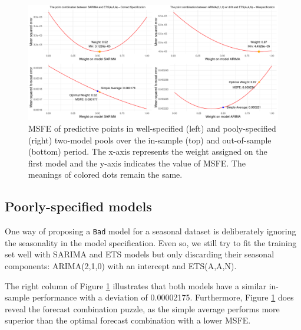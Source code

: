 \documentclass{monashthesis}
\begin{document}
\begin{figure}[ht]
\centering
\includegraphics[scale=0.5]{figures/EMPL.pdf}
\caption{MSFE of predictive points in well-specified (left) and pooly-specified (right) two-model pools over the in-sample (top) and out-of-sample (bottom) period. The x-axis represents the weight assigned on the first model and the y-axis indicates the value of MSFE. The meanings of colored dots remain the same.}
\label{fig:sd}
\end{figure}

\hypertarget{poorly-specified-models}{%
\subsection{Poorly-specified models}\label{poorly-specified-models}}

One way of proposing a \texttt{Bad} model for a seasonal dataset is deliberately ignoring the seasonality in the model specification. Even so, we still try to fit the training set well with SARIMA and ETS models but only discarding their seasonal components: ARIMA(2,1,0) with an intercept and ETS(A,A,N).

The right column of Figure \ref{fig:sd} illustrates that both models have a similar in-sample performance with a deviation of 0.00002175. Furthermore, Figure \ref{fig:sd} does reveal the forecast combination puzzle, as the simple average performs more superior than the optimal forecast combination with a lower MSFE.
\end{document}
